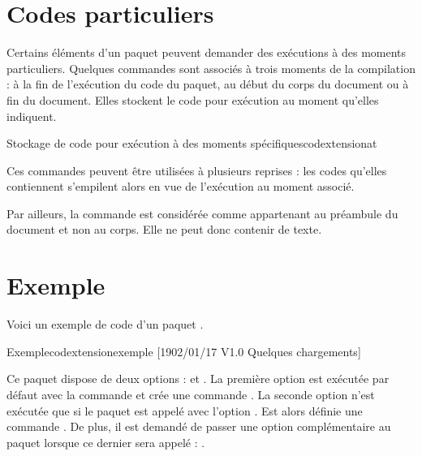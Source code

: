 \section{Codes particuliers}

Certains éléments d'un paquet peuvent demander des exécutions à des moments particuliers. Quelques commandes sont associés à trois moments de la compilation : à la fin de l'exécution du code du paquet, au début du corps du document ou à fin du document. Elles stockent le code pour exécution au moment qu'elles indiquent.

\begin{codesimple}{Stockage de code pour exécution à des moments spécifiques}{codextensionat}
\end{codesimple}

Ces commandes peuvent être utilisées à plusieurs reprises : les codes qu'elles contiennent s'empilent alors en vue de l'exécution au moment associé.

Par ailleurs, la commande  est considérée comme appartenant au préambule du document et non au corps. Elle ne peut donc contenir de texte.

\section{Exemple}

Voici un exemple de code d'un paquet .

\begin{codesimple}{Exemple}{codextensionexemple}
[1902/01/17 V1.0 Quelques chargements]



\ProcessOptions \relax

\RequirePackage{xcolor}
\RequirePackage{xspace}
\newcommand{\MonLaTeX}{\LaTeX\xspace}
\end{codesimple}

Ce paquet dispose de deux options :  et . La première option est exécutée par défaut avec la commande  et crée une commande . La seconde option n'est exécutée que si le paquet  est appelé avec l'option . Est alors définie une commande . De plus, il est demandé de passer une option complémentaire au paquet  lorsque ce dernier sera appelé : . 

